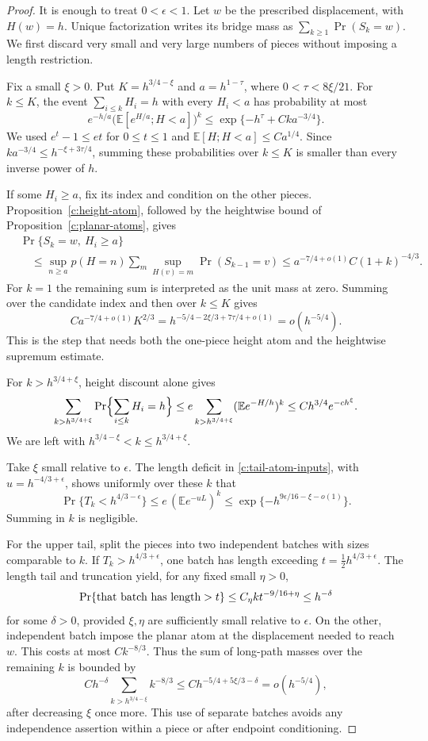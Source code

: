 \documentclass[11pt]{article}
\numberwithin{equation}{section}
\theoremstyle{definition}\newtheorem{definition}[theorem]{Definition}
\theoremstyle{remark}\newtheorem{remark}[theorem]{Remark}
\begin{document}
\begin{proof}
It is enough to treat $0<\epsilon<1$.  Let $w$ be the prescribed
displacement, with $H(w)=h$.  Unique
factorization writes its bridge mass as
$\sum_{k\ge1}\Pr(S_k=w)$.  We first discard very small and very large
numbers of pieces without imposing a length restriction.

Fix a small $\xi>0$.  Put $K=h^{3/4-\xi}$ and
$a=h^{1-\tau}$, where $0<\tau<8\xi/21$.  For $k\le K$, the event
$\sum_{i\le k}H_i=h$ with every $H_i<a$ has probability at most
\[
 e^{-h/a}\bigl(\mathbb E[e^{H/a};H<a]\bigr)^k
 \le\exp\{-h^\tau+Cka^{-3/4}\}.
\]
We used $e^t-1\le et$ for $0\le t\le1$ and
$\mathbb E[H;H<a]\le Ca^{1/4}$.  Since
$ka^{-3/4}\le h^{-\xi+3\tau/4}$, summing these probabilities over
$k\le K$ is smaller than every inverse power of $h$.

If some $H_i\ge a$, fix its index and condition on the other pieces.
Proposition~\ref{c:height-atom}, followed by the heightwise bound of
Proposition~\ref{c:planar-atoms}, gives
\begin{align*}
 &\Pr\{S_k=w,\ H_i\ge a\}\\
 &\quad\le
 \sup_{n\ge a}p(H=n)
 \sum_m\sup_{H(v)=m}\Pr(S_{k-1}=v)
 \le a^{-7/4+o(1)}C(1+k)^{-4/3}.
\end{align*}
For $k=1$ the remaining sum is interpreted as the unit mass at zero.
Summing over the candidate index and then over $k\le K$ gives
\[
 C a^{-7/4+o(1)}K^{2/3}
 =h^{-5/4-2\xi/3+7\tau/4+o(1)}
 =o(h^{-5/4}).
\]
This is the step that needs both the one-piece height atom and the
heightwise supremum estimate.

For $k>h^{3/4+\xi}$, height discount alone gives
\[
 \sum_{k>h^{3/4+\xi}}\Pr\Bigl\{\sum_{i\le k}H_i=h\Bigr\}
 \le e\sum_{k>h^{3/4+\xi}}(\mathbb E e^{-H/h})^k
 \le Ch^{3/4}e^{-ch^\xi}.
\]
We are left with
$h^{3/4-\xi}<k\le h^{3/4+\xi}$.

Take $\xi$ small relative to $\epsilon$.  The length deficit in
\eqref{c:tail-atom-inputs}, with
$u=h^{-4/3+\epsilon}$, shows uniformly over these $k$ that
\[
 \Pr\{T_k<h^{4/3-\epsilon}\}
 \le e\,(\mathbb E e^{-uL})^k
 \le\exp\{-h^{9\epsilon/16-\xi-o(1)}\}.
\]
Summing in $k$ is negligible.

For the upper tail, split the pieces into two independent batches with
sizes comparable to $k$.  If $T_k>h^{4/3+\epsilon}$, one batch has
length exceeding $t=\tfrac12h^{4/3+\epsilon}$.  The length tail and
truncation yield, for any fixed small $\eta>0$,
\[
 \Pr\{\hbox{that batch has length}>t\}
 \le C_\eta k t^{-9/16+\eta}
 \le h^{-\delta}
\]
for some $\delta>0$, provided $\xi,\eta$ are sufficiently small
relative to $\epsilon$.  On the other, independent batch impose the
planar atom at the displacement needed to reach $w$.  This costs at
most $Ck^{-8/3}$.  Thus the sum of long-path masses over the remaining
$k$ is bounded by
\[
 C h^{-\delta}
 \sum_{k>h^{3/4-\xi}}k^{-8/3}
 \le C h^{-5/4+5\xi/3-\delta}=o(h^{-5/4}),
\]
after decreasing $\xi$ once more.  This use of separate batches avoids
any independence assertion within a piece or after endpoint
conditioning.


\end{proof}
\end{document}
